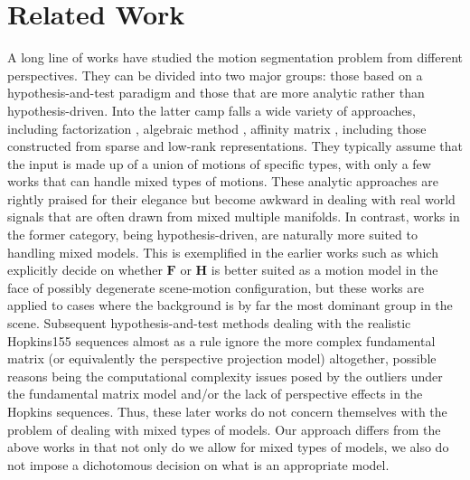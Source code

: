 \documentclass[10pt,twocolumn,letterpaper]{article}
\begin{document}
\section{Related Work}
A long line of works have studied the motion segmentation problem from different perspectives. They can be divided into two major groups: those based on a hypothesis-and-test paradigm and those that are more analytic rather than hypothesis-driven. Into the latter camp falls a wide variety of approaches, including factorization \cite{boult1991factorization,costeira1998multibody, gear1998multibody,gruber2004multibody,tomasi1992shape}, algebraic method \cite{Rao2010,vidal2004motion,vidal2005generalized,Vidal2008}, affinity matrix \cite{lauer2009spectral,yan2006general}, including those constructed from sparse \cite{Elhamifar2013} and low-rank \cite{liu2013robust} representations. They typically assume that the input is made up of a union of motions of specific types, with only a few works \cite{goh2007segmenting,Rao2010} that can handle mixed types of motions. These analytic approaches are rightly praised for their elegance but become awkward in dealing with real world signals that are often drawn from mixed multiple manifolds. In contrast, works in the former category, being hypothesis-driven, are naturally more suited to handling mixed models. This is exemplified in the earlier works such as \cite{sugaya2004geometric,Torr1998} which explicitly decide on whether $\mathbf{F}$ or $\mathbf{H}$ is better suited as a motion model in the face of possibly degenerate scene-motion configuration, but these works are applied to cases where the background is by far the most dominant group in the scene. Subsequent hypothesis-and-test methods \cite{Chin2009,chin2010accelerated,lazic2009floss} dealing with the realistic Hopkins155 \cite{Tron2007} sequences almost as a rule ignore the more complex fundamental matrix (or equivalently the perspective projection model) altogether, possible reasons being the computational complexity issues posed by the outliers under the fundamental matrix model and/or the lack of perspective effects in the Hopkins sequences. Thus, these later works do not concern themselves with the problem of dealing with mixed types of models. Our approach differs from the above works in that not only do we allow for mixed types of models, we also do not impose a dichotomous decision on what is an appropriate model.  
\end{document}

